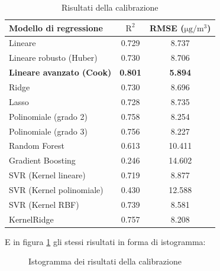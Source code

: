 \begin{table}[H]
    \footnotesize
    \centering
    \begin{tabular}{|l|c|c|}
    \hline
        \textbf{Modello di regressione} & $\bm{\mathrm{R^2}}$ & \textbf{RMSE (}$\mathrm{\si{\micro}g/m^3}$) \\ \hline
        Lineare & 0.729 & 8.737 \\ \hline
        Lineare robusto (Huber) & 0.730 & 8.706 \\ \hline
        \textbf{Lineare avanzato (Cook)} & \textbf{0.801} & \textbf{5.894} \\ \hline
        Ridge & 0.730 & 8.696 \\ \hline
        Lasso & 0.728 & 8.735 \\ \hline
        Polinomiale (grado 2) & 0.758 & 8.254 \\ \hline
        Polinomiale (grado 3) & 0.756 & 8.227 \\ \hline
        Random Forest & 0.613 & 10.411 \\ \hline
        Gradient Boosting & 0.246 & 14.602 \\ \hline
        SVR (Kernel lineare) & 0.719 & 8.877 \\ \hline
        SVR (Kernel polinomiale) & 0.430 & 12.588 \\ \hline
        SVR (Kernel RBF) & 0.739 & 8.581 \\ \hline
        KernelRidge & 0.757 & 8.208 \\ \hline
    \end{tabular}
    \captionsetup{justification=centering}
    \caption{Risultati della calibrazione }
    \label{fig:risultati-pm2.5}
\end{table}

E in figura \ref{fig:risultati-pm2.5-hist} gli stessi risultati in forma di istogramma:

\begin{figure}[H]%
    \centering
    \captionsetup{justification=centering}
    \caption{Istogramma dei risultati della calibrazione }%
    \label{fig:risultati-pm2.5-hist}%
\end{figure}

